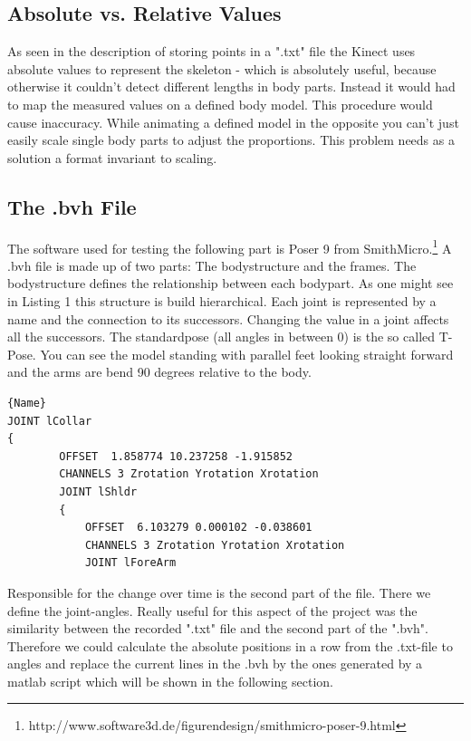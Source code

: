 \documentclass[a4paper]{article}
\begin{document}
\subsection{Absolute vs. Relative Values}

As seen in the description of storing points in a ".txt" file the Kinect uses absolute values to represent the skeleton  - which is absolutely useful, because otherwise it couldn't detect different lengths in body parts.
Instead it would had to map the measured values on a defined body model.
This procedure would cause inaccuracy.
While animating a defined model in the opposite you can't just easily scale single body parts to adjust the proportions.
This problem needs as a solution a format invariant to scaling.

\subsection{The .bvh File}

The software used for testing the following part is Poser 9 from SmithMicro.\footnote{http://www.software3d.de/figurendesign/smithmicro-poser-9.html}
A .bvh file is made up of two parts: The bodystructure and the frames.
The bodystructure defines the relationship between each bodypart.
As one might see in Listing 1 this structure is build hierarchical.
Each joint is represented by a name and the connection to its successors.
Changing the value in a joint affects all the successors. 
The standardpose (all angles in between 0) is the so called T-Pose.
You can see the model standing with parallel feet looking straight forward and the arms are bend 90 degrees relative to the body.

\begin{lstlisting}[caption=.bvh Connected Structure]{Name}
JOINT lCollar
{
		OFFSET	1.858774 10.237258 -1.915852
		CHANNELS 3 Zrotation Yrotation Xrotation
		JOINT lShldr
		{
			OFFSET	6.103279 0.000102 -0.038601
			CHANNELS 3 Zrotation Yrotation Xrotation
			JOINT lForeArm
\end{lstlisting}

Responsible for the change over time is the second part of the file.
There we define the joint-angles.
Really useful for this aspect of the project was the similarity between the recorded ".txt" file and the second part of the ".bvh".
Therefore we could calculate the absolute positions in a row from the .txt-file to angles and replace the current lines in the .bvh by the ones generated by a matlab script which will be shown in the following section.
\end{document}
